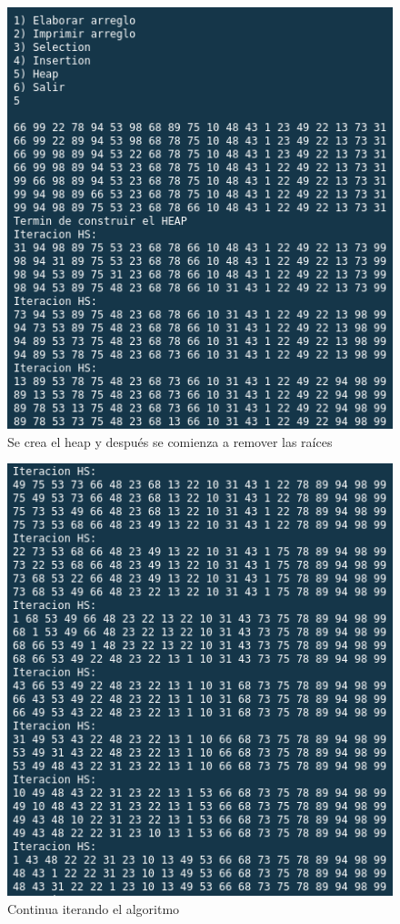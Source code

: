 \documentclass{article}
\begin{document}
			\begin{figure}[H]
				\centering
				\includegraphics[scale = 0.8]{images/e2-5-2}
				\caption{Se crea el heap y después se comienza a remover las raíces}
			\end{figure}
			
			\begin{figure}[H]
				\centering
				\includegraphics[scale = 0.8]{images/e2-5-3}
				\caption{Continua iterando el algoritmo}
			\end{figure}
		
\end{document}

